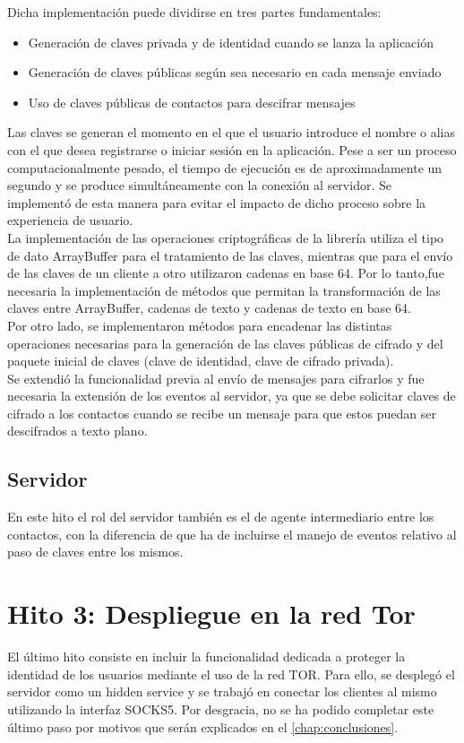 Dicha implementación puede dividirse en tres partes fundamentales: 

\begin{itemize}
\item {Generación de claves privada y de identidad cuando se lanza la aplicación}
\item {Generación de claves públicas según sea necesario en cada mensaje enviado}
\item {Uso de claves públicas de contactos para descifrar mensajes}
\end{itemize}

Las claves se generan el momento en el que el usuario introduce el nombre o alias con el que desea registrarse o iniciar sesión en la aplicación. Pese a ser un proceso computacionalmente pesado, el tiempo de ejecución es de aproximadamente un segundo y se produce simultáneamente con la conexión al servidor. Se implementó de esta manera para evitar el impacto de dicho proceso sobre la experiencia de usuario. \\

La implementación de las operaciones criptográficas de la librería utiliza el tipo de dato ArrayBuffer para el tratamiento de las claves, mientras que para el envío de las claves de un cliente a otro utilizaron cadenas en base 64. Por lo tanto,fue necesaria la implementación de métodos que permitan la transformación de las claves entre ArrayBuffer, cadenas de texto y cadenas de texto en base 64. \\

Por otro lado, se implementaron métodos para encadenar las distintas operaciones necesarias para la generación de las claves públicas de cifrado y del paquete inicial de claves (clave de identidad, clave de cifrado privada). \\

Se extendió la funcionalidad previa al envío de mensajes para cifrarlos y fue necesaria la extensión de los eventos al servidor, ya que se debe solicitar claves de cifrado a los contactos cuando se recibe un mensaje para que estos puedan ser descifrados a texto plano.

\subsection{Servidor}

En este hito el rol del servidor también es el de agente intermediario entre los contactos, con la diferencia de que ha de incluirse el manejo de eventos relativo al paso de claves entre los mismos.

\section{Hito 3: Despliegue en la red Tor}

El último hito consiste en incluir la funcionalidad dedicada a proteger la identidad de los usuarios mediante el uso de la red TOR. Para ello, se desplegó el servidor como un hidden service y se trabajó en conectar los clientes al mismo utilizando la interfaz SOCKS5. Por desgracia, no se ha podido completar este último paso por motivos que serán explicados en el \autoref{chap:conclusiones}. \\ 
